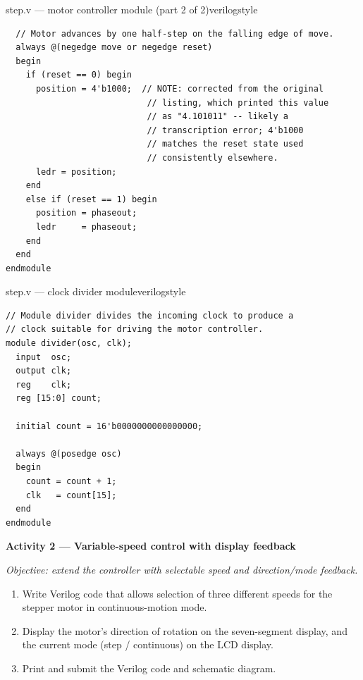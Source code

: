 \begin{procedure}
  \begin{codepanel}{step.v --- motor controller module (part 2 of 2)}{verilogstyle}
    \begin{lstlisting}
  // Motor advances by one half-step on the falling edge of move.
  always @(negedge move or negedge reset)
  begin
    if (reset == 0) begin
      position = 4'b1000;  // NOTE: corrected from the original
                            // listing, which printed this value
                            // as "4.101011" -- likely a
                            // transcription error; 4'b1000
                            // matches the reset state used
                            // consistently elsewhere.
      ledr = position;
    end
    else if (reset == 1) begin
      position = phaseout;
      ledr     = phaseout;
    end
  end
endmodule
\end{lstlisting}
  \end{codepanel}
  \vspace{-4pt}

  \begin{codepanel}{step.v --- clock divider module}{verilogstyle}
    \begin{lstlisting}
// Module divider divides the incoming clock to produce a
// clock suitable for driving the motor controller.
module divider(osc, clk);
  input  osc;
  output clk;
  reg    clk;
  reg [15:0] count;

  initial count = 16'b0000000000000000;

  always @(posedge osc)
  begin
    count = count + 1;
    clk   = count[15];
  end
endmodule
\end{lstlisting}
  \end{codepanel}
  \vspace{-4pt}
  \vspace{1.5em}

  \textbf{Activity 2 --- Variable-speed control with display feedback}\vspace{2pt}

  \textit{Objective: extend the controller with selectable speed and direction/mode feedback.}

  \begin{enumerate}
    \item Write Verilog code that allows selection of three different speeds for the stepper motor in continuous-motion mode.
    \item Display the motor's direction of rotation on the seven-segment display, and the current mode (step / continuous) on the LCD display.
    \item Print and submit the Verilog code and schematic diagram.
  \end{enumerate}
\end{procedure}

